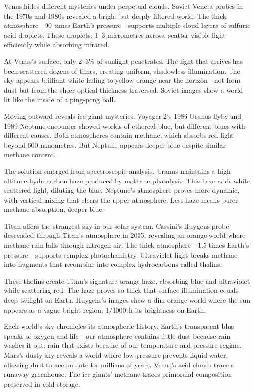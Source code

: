 Venus hides different mysteries under perpetual clouds. Soviet Venera probes in the 1970s and 1980s revealed a bright but deeply filtered world. The thick atmosphere—90 times Earth's pressure—supports multiple cloud layers of sulfuric acid droplets. These droplets, 1–3 micrometres across, scatter visible light efficiently while absorbing infrared.

At Venus's surface, only 2–3\% of sunlight penetrates. The light that arrives has been scattered dozens of times, creating uniform, shadowless illumination. The sky appears brilliant white fading to yellow-orange near the horizon—not from dust but from the sheer optical thickness traversed. Soviet images show a world lit like the inside of a ping-pong ball.

Moving outward reveals ice giant mysteries. Voyager 2's 1986 Uranus flyby and 1989 Neptune encounter showed worlds of ethereal blue, but different blues with different causes. Both atmospheres contain methane, which absorbs red light beyond 600 nanometres. But Neptune appears deeper blue despite similar methane content.

The solution emerged from spectroscopic analysis. Uranus maintains a high-altitude hydrocarbon haze produced by methane photolysis. This haze adds white scattered light, diluting the blue. Neptune's atmosphere proves more dynamic, with vertical mixing that clears the upper atmosphere. Less haze means purer methane absorption, deeper blue.

Titan offers the strangest sky in our solar system. Cassini's Huygens probe descended through Titan's atmosphere in 2005, revealing an orange world where methane rain falls through nitrogen air. The thick atmosphere—1.5 times Earth's pressure—supports complex photochemistry. Ultraviolet light breaks methane into fragments that recombine into complex hydrocarbons called tholins.

These tholins create Titan's signature orange haze, absorbing blue and ultraviolet while scattering red. The haze proves so thick that surface illumination equals deep twilight on Earth. Huygens's images show a dim orange world where the sun appears as a vague bright region, 1/1000th its brightness on Earth.

Each world's sky chronicles its atmospheric history. Earth's transparent blue speaks of oxygen and life—our atmosphere contains little dust because rain washes it out, rain that exists because of our temperature and pressure regime. Mars's dusty sky reveals a world where low pressure prevents liquid water, allowing dust to accumulate for millions of years. Venus's acid clouds trace a runaway greenhouse. The ice giants' methane traces primordial composition preserved in cold storage.

